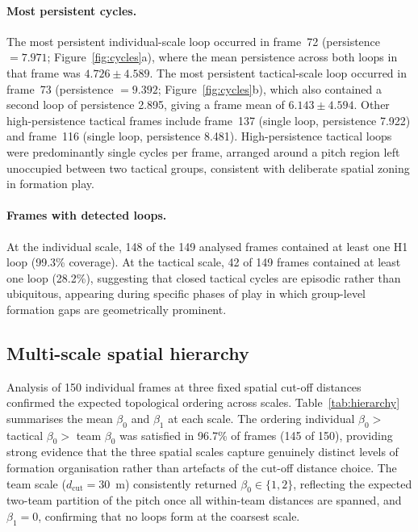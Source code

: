 \documentclass[11pt,a4paper]{article}
\begin{document}
\paragraph{Most persistent cycles.}
The most persistent individual-scale loop occurred in
frame~72 (persistence \(= 7.971\); Figure~\ref{fig:cycles}a),
where the mean persistence across both loops in that frame
was \(4.726 \pm 4.589\).
The most persistent tactical-scale loop occurred in
frame~73 (persistence \(= 9.392\); Figure~\ref{fig:cycles}b),
which also contained a second loop of persistence 2.895,
giving a frame mean of \(6.143 \pm 4.594\).
Other high-persistence tactical frames include frame~137
(single loop, persistence 7.922) and frame~116 (single
loop, persistence 8.481).
High-persistence tactical loops were predominantly single
cycles per frame, arranged around a pitch region left
unoccupied between two tactical groups, consistent with
deliberate spatial zoning in formation play.

\paragraph{Frames with detected loops.}
At the individual scale, 148 of the 149 analysed frames
contained at least one H1 loop (99.3\% coverage).  At the
tactical scale, 42 of 149 frames contained at least one
loop (28.2\%), suggesting that closed tactical cycles are
episodic rather than ubiquitous, appearing during specific
phases of play in which group-level formation gaps are
geometrically prominent.

\subsection{Multi-scale spatial hierarchy}
\label{sec:hierarchy_results}

Analysis of 150 individual frames at three fixed spatial
cut-off distances confirmed the expected topological
ordering across scales.
Table~\ref{tab:hierarchy} summarises the mean \(\beta_0\)
and \(\beta_1\) at each scale.
The ordering individual \(\beta_0 >\) tactical \(\beta_0 >\)
team \(\beta_0\) was satisfied in 96.7\% of frames (145 of
150), providing strong evidence that the three spatial scales
capture genuinely distinct levels of formation organisation
rather than artefacts of the cut-off distance choice.
The team scale (\(d_{\text{cut}} = 30\)~m) consistently
returned \(\beta_0 \in \{1, 2\}\), reflecting the expected
two-team partition of the pitch once all within-team
distances are spanned, and \(\beta_1 = 0\), confirming that
no loops form at the coarsest scale.
\end{document}
